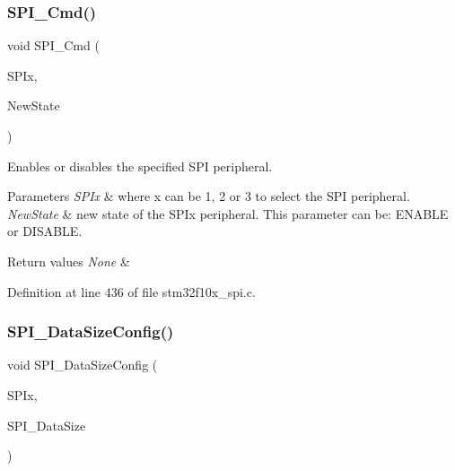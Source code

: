 \subsubsection{\texorpdfstring{S\+P\+I\+\_\+\+Cmd()}{SPI\_Cmd()}}
{\footnotesize\ttfamily void S\+P\+I\+\_\+\+Cmd (\begin{DoxyParamCaption}\item[{\hyperlink{struct_s_p_i___type_def}{S\+P\+I\+\_\+\+Type\+Def} $\ast$}]{S\+P\+Ix,  }\item[{\hyperlink{group___exported__types_gac9a7e9a35d2513ec15c3b537aaa4fba1}{Functional\+State}}]{New\+State }\end{DoxyParamCaption})}



Enables or disables the specified S\+PI peripheral. 


\begin{DoxyParams}{Parameters}
{\em S\+P\+Ix} & where x can be 1, 2 or 3 to select the S\+PI peripheral. \\
\hline
{\em New\+State} & new state of the S\+P\+Ix peripheral. This parameter can be\+: E\+N\+A\+B\+LE or D\+I\+S\+A\+B\+LE. \\
\hline
\end{DoxyParams}

\begin{DoxyRetVals}{Return values}
{\em None} & \\
\hline
\end{DoxyRetVals}


Definition at line 436 of file stm32f10x\+\_\+spi.\+c.

\mbox{\label{group___s_p_i___private___functions_gafc82e90841d7879535d655c035709cb1}} 
\subsubsection{\texorpdfstring{S\+P\+I\+\_\+\+Data\+Size\+Config()}{SPI\_DataSizeConfig()}}
{\footnotesize\ttfamily void S\+P\+I\+\_\+\+Data\+Size\+Config (\begin{DoxyParamCaption}\item[{\hyperlink{struct_s_p_i___type_def}{S\+P\+I\+\_\+\+Type\+Def} $\ast$}]{S\+P\+Ix,  }\item[{uint16\+\_\+t}]{S\+P\+I\+\_\+\+Data\+Size }\end{DoxyParamCaption})}



